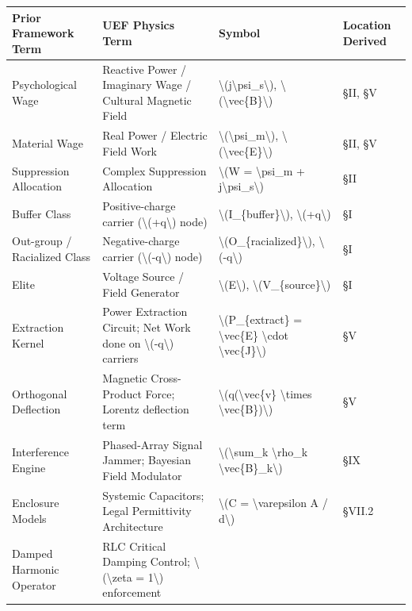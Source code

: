 {{\def\LTcaptype{none} %
\begin{longtable}[]{@{}llll@{}}
\toprule\noalign{}
Prior Framework Term & UEF Physics Term & Symbol & Location Derived \\
\midrule\noalign{}
\endhead
\bottomrule\noalign{}
\endlastfoot
Psychological Wage & Reactive Power / Imaginary Wage / Cultural Magnetic
Field & \textbackslash(j\textbackslash psi\_s\textbackslash),
\textbackslash(\textbackslash vec\{B\}\textbackslash) & §II, §V \\
Material Wage & Real Power / Electric Field Work &
\textbackslash(\textbackslash psi\_m\textbackslash),
\textbackslash(\textbackslash vec\{E\}\textbackslash) & §II, §V \\
Suppression Allocation & Complex Suppression Allocation &
\textbackslash(W = \textbackslash psi\_m +
j\textbackslash psi\_s\textbackslash) & §II \\
Buffer Class & Positive-charge carrier (\textbackslash(+q\textbackslash)
node) & \textbackslash(I\_\{buffer\}\textbackslash),
\textbackslash(+q\textbackslash) & §I \\
Out-group / Racialized Class & Negative-charge carrier
(\textbackslash(-q\textbackslash) node) &
\textbackslash(O\_\{racialized\}\textbackslash),
\textbackslash(-q\textbackslash) & §I \\
Elite & Voltage Source / Field Generator &
\textbackslash(E\textbackslash),
\textbackslash(V\_\{source\}\textbackslash) & §I \\
Extraction Kernel & Power Extraction Circuit; Net Work done on
\textbackslash(-q\textbackslash) carriers &
\textbackslash(P\_\{extract\} = \textbackslash vec\{E\}
\textbackslash cdot \textbackslash vec\{J\}\textbackslash) & §V \\
Orthogonal Deflection & Magnetic Cross-Product Force; Lorentz deflection
term & \textbackslash(q(\textbackslash vec\{v\} \textbackslash times
\textbackslash vec\{B\})\textbackslash) & §V \\
Interference Engine & Phased-Array Signal Jammer; Bayesian Field
Modulator & \textbackslash(\textbackslash sum\_k \textbackslash rho\_k
\textbackslash vec\{B\}\_k\textbackslash) & §IX \\
Enclosure Models & Systemic Capacitors; Legal Permittivity Architecture
& \textbackslash(C = \textbackslash varepsilon A / d\textbackslash) &
§VII.2 \\
Damped Harmonic Operator & RLC Critical Damping Control;
\textbackslash(\textbackslash zeta = 1\textbackslash) enforcement &

\end{longtable}}}
